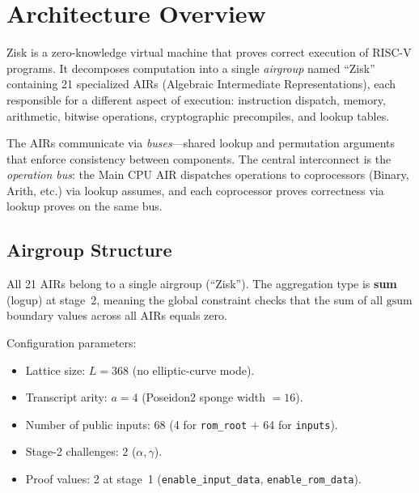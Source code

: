 \section{Architecture Overview}
\label{sec:architecture}

Zisk is a zero-knowledge virtual machine that proves correct execution
of RISC-V programs.
It decomposes computation into a single \emph{airgroup} named ``Zisk''
containing 21 specialized AIRs (Algebraic Intermediate Representations),
each responsible for a different aspect of execution:
instruction dispatch, memory, arithmetic, bitwise operations,
cryptographic precompiles, and lookup tables.

The AIRs communicate via \emph{buses}---shared lookup and permutation
arguments that enforce consistency between components.
The central interconnect is the \emph{operation bus}: the Main CPU AIR
dispatches operations to coprocessors (Binary, Arith, etc.) via lookup
assumes, and each coprocessor proves correctness via lookup proves on
the same bus.

\subsection{Airgroup Structure}
\label{sec:airgroup}

All 21 AIRs belong to a single airgroup (``Zisk'').
The aggregation type is \textbf{sum} (logup) at stage~2,
meaning the global constraint checks that the sum of all $\mathrm{gsum}$
boundary values across all AIRs equals zero.

Configuration parameters:
\begin{itemize}[nosep]
  \item Lattice size: $L = 368$ (no elliptic-curve mode).
  \item Transcript arity: $a = 4$ (Poseidon2 sponge width $= 16$).
  \item Number of public inputs: 68
        (4 for \texttt{rom\_root} $+$ 64 for \texttt{inputs}).
  \item Stage-2 challenges: 2 ($\alpha, \gamma$).
  \item Proof values: 2 at stage~1
        (\texttt{enable\_input\_data}, \texttt{enable\_rom\_data}).
\end{itemize}

